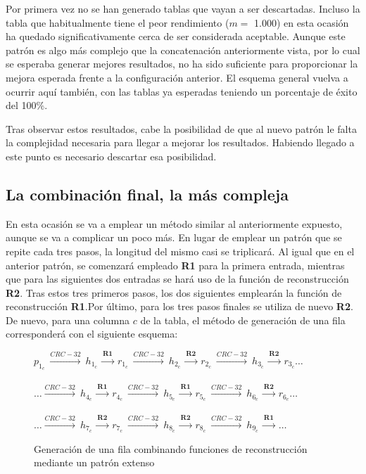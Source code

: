 \documentclass[12pt,spanish,listoffigures,listoftables,listofalgorithms]{tfgetsinf}
\begin{document}
Por primera vez no se han generado tablas que vayan a ser descartadas. Incluso la tabla que habitualmente tiene el peor rendimiento ($m =$ 1.000) en esta ocasión ha quedado significativamente cerca de ser considerada aceptable. Aunque este patrón es algo más complejo que la concatenación anteriormente vista, por lo cual se esperaba generar mejores resultados, no ha sido suficiente para proporcionar la mejora esperada frente a la configuración anterior. El esquema general vuelva a ocurrir aquí también, con las tablas ya esperadas teniendo un porcentaje de éxito del 100\%.

Tras observar estos resultados, cabe la posibilidad de que al nuevo patrón le falta la complejidad necesaria para llegar a mejorar los resultados. Habiendo llegado a este punto es necesario descartar esa posibilidad.

\subsection{La combinación final, la más compleja}

En esta ocasión se va a emplear un método similar al anteriormente expuesto, aunque se va a complicar un poco más. En lugar de emplear un patrón que se repite cada tres pasos, la longitud del mismo casi se triplicará. Al igual que en el anterior patrón, se comenzará empleado \textbf{R1} para la primera entrada, mientras que para las siguientes dos entradas se hará uso de la función de reconstrucción \textbf{R2}. Tras estos tres primeros pasos, los dos siguientes emplearán la función de reconstrucción \textbf{R1}.Por último, para los tres pasos finales se utiliza de nuevo \textbf{R2}. De nuevo, para una columna $c$ de la tabla, el método de generación de una fila corresponderá con el siguiente esquema:

\begin{figure}[H]
	
	\centering

	$p_{1_c}~ \xrightarrow{CRC-32}~ h_{1_c}~ \xrightarrow{\textbf{R1}}~ r_{1_c}~ \xrightarrow{CRC-32}~ h_{2_c}~ \xrightarrow{\textbf{R2}}~ r_{2_c}~ \xrightarrow{CRC-32}~ h_{3_c}~ \xrightarrow{\textbf{R2}}~ r_{3_c} \dots$ \\
	~\\
	$\dots \xrightarrow{CRC-32}~ h_{4_c}~ \xrightarrow{\textbf{R1}}~ r_{4_c}~ \xrightarrow{CRC-32}~ h_{5_c}~ \xrightarrow{\textbf{R1}}~ r_{5_c}~ \xrightarrow{CRC-32}~ h_{6_c}~ \xrightarrow{\textbf{R2}}~ r_{6_c} \dots$ \\
	~\\
	$\dots \xrightarrow{CRC-32}~ h_{7_c}~ \xrightarrow{\textbf{R2}}~ r_{7_c}~ \xrightarrow{CRC-32}~ h_{8_c}~ \xrightarrow{\textbf{R2}}~ r_{8_c}~ \xrightarrow{CRC-32}~ h_{9_c}~\xrightarrow{\textbf{R1}}~ \dots$\;\;\;\; \\

	\caption{Generación de una fila combinando funciones de reconstrucción mediante un patrón extenso}
	\label{filaPG}

\end{figure}
\end{document}
